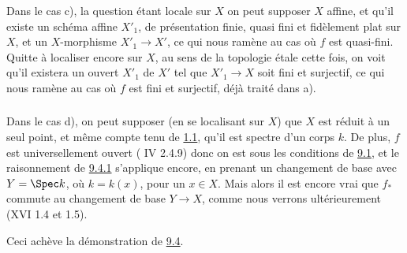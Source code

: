 \documentclass[10pt]{../fichiers-configuration-latex/smfart}
\begin{document}
Dans le cas c), la question étant locale sur $X$ on peut supposer $X$
affine, et qu'il existe un schéma affine $X'_{1}$, de présentation
finie, quasi fini et fidèlement plat sur $X$, et un $X$-morphisme
$X'_{1}\rightarrow X'$, ce qui nous ramène au cas où $f$ est
quasi-fini. Quitte à localiser encore sur $X$, au sens de la topologie
étale cette fois, on voit qu'il existera un ouvert $X'_{1}$ de $X'$
tel que $X'_{1}\rightarrow X$ soit fini et surjectif, ce qui nous
ramène au cas où $f$ est fini et surjectif, déjà traité dans a).

\subsubsection{}
Dans le cas d), on peut supposer (en se localisant sur $X$) que $X$
est réduit à un seul point, et même compte tenu de \hyperref[VIII.thm1.1]{1.1}, qu'il est
spectre d'un corps $k$. De plus, $f$ est universellement ouvert (\EGA
IV 2.4.9) donc on est sous les conditions de \hyperref[VIII.prop9.1]{9.1}, et le raisonnement
de \hyperref[VIII.subsubsec9.4.1]{9.4.1} s'applique encore, en prenant un changement de base avec
$Y=\Spec k$, où $k=k(x)$, pour un $x\in X$. Mais alors il est encore
vrai que $f_{\ast}$ commute au changement de base $Y\rightarrow X$,
comme nous verrons ultérieurement (XVI 1.4 et 1.5).

Ceci achève la démonstration de \hyperref[VIII.thm9.4]{9.4}.


\ifx\danslelivre\undefined
\end{document}
